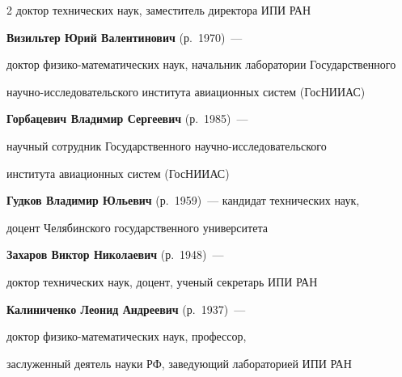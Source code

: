 \begin{multicols}{2}
доктор технических наук, заместитель директора ИПИ РАН



\vspace*{6pt}



\noindent

\textbf{Визильтер Юрий Валентинович} (р.\ 1970)~--- 

доктор фи\-зи\-ко-математических наук, начальник лаборатории Государственного 

научно-исследовательского института авиационных систем (ГосНИИАС)



\vspace*{6pt}



\noindent

\textbf{Горбацевич Владимир Сергеевич} (р.\ 1985)~--- 

научный сотрудник Государственного научно-ис\-сле\-до\-ва\-тель\-ско\-го 

института авиационных систем (ГосНИИАС)



\vspace*{6pt}



\noindent

\textbf{Гудков Владимир Юльевич} (р.\ 1959)~---  кандидат технических наук,

доцент  Челябинского государственного университета



\vspace*{6pt}



\noindent

\textbf{Захаров Виктор Николаевич} (р.\ 1948)~--- 

доктор технических наук, доцент, ученый секретарь ИПИ РАН



\vspace*{6pt}



\noindent

\textbf{Калиниченко Леонид Андреевич} (р.\ 1937)~--- 

доктор фи\-зи\-ко-математических  наук, профессор, 

заслуженный деятель науки РФ, за\-ве\-ду\-ющий лабораторией ИПИ РАН



\vspace*{6pt}




\end{multicols}

